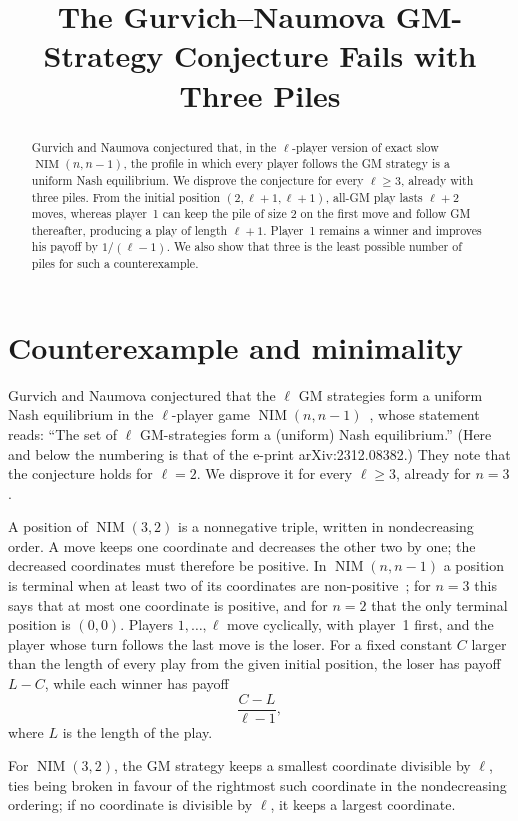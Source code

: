 \documentclass[11pt]{amsart}
\title[The GM-strategy conjecture]
{The Gurvich--Naumova GM-Strategy Conjecture Fails with Three Piles}
\date{}
\newcommand{\NIM}{\operatorname{NIM}}
\begin{document}
\begin{abstract}
Gurvich and Naumova conjectured that, in the $\ell$-player version of
exact slow $\NIM(n,n-1)$, the profile in which every player follows the
GM strategy is a uniform Nash equilibrium. We disprove the conjecture
for every $\ell\ge 3$, already with three piles. From the initial
position $(2,\ell+1,\ell+1)$, all-GM play lasts $\ell+2$ moves, whereas
player~1 can keep the pile of size $2$ on the first move and follow GM
thereafter, producing a play of length $\ell+1$. Player~1 remains a
winner and improves his payoff by $1/(\ell-1)$. We also show that three
is the least possible number of piles for such a counterexample.
\end{abstract}

\maketitle

\section{Counterexample and minimality}

Gurvich and Naumova conjectured that the $\ell$ GM strategies form a
uniform Nash equilibrium in the $\ell$-player game
$\NIM(n,n-1)$~\cite[Section~6.5, Conjecture~1]{GN}, whose statement
reads: ``The set of $\ell$ GM-strategies form a (uniform) Nash
equilibrium.'' (Here and below the numbering is that of the e-print
arXiv:2312.08382.) They note that the conjecture holds for $\ell=2$.
We disprove it for every $\ell\ge 3$, already for $n=3$.

A position of $\NIM(3,2)$ is a nonnegative triple, written in
nondecreasing order. A move keeps one coordinate and decreases the
other two by one; the decreased coordinates must therefore be
positive. In $\NIM(n,n-1)$ a position is terminal when at least two of
its coordinates are non-positive~\cite[Section~6.5]{GN}; for $n=3$ this
says that at most one coordinate is positive, and for $n=2$ that the
only terminal position is $(0,0)$. Players $1,\ldots,\ell$ move
cyclically, with player~1 first, and the player whose turn follows the
last move is the loser. For a
fixed constant $C$ larger than the length of every play from the given
initial position, the loser has payoff $L-C$, while each winner has
payoff
\[
  \frac{C-L}{\ell-1},
\]
where $L$ is the length of the play.

For $\NIM(3,2)$, the GM strategy keeps a smallest coordinate divisible
by $\ell$, ties being broken in favour of the rightmost such coordinate
in the nondecreasing ordering; if no coordinate is divisible by $\ell$,
it keeps a largest coordinate.
\end{document}
